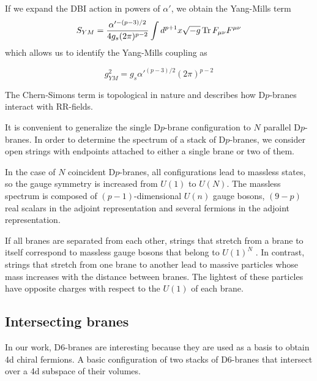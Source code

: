 If we expand the DBI action in powers of $\alpha'$, we obtain the Yang-Mills term
\begin{equation}
  S_{YM} = \frac{\alpha'^{-(p-3)/2}}{4g_s (2\pi)^{p-2}} \int d^{p+1} x \sqrt {-g} \Tr F_{\mu\nu} F^{\mu\nu}
\end{equation}
which allows us to identify the Yang-Mills coupling as 

\begin{equation}
g^2_{YM} = g_s \alpha'^{(p-3)/2}(2\pi)^{p-2}
\end{equation}

The Chern-Simons term is topological in nature and describes how D$p$-branes interact with RR-fields.


It is convenient to generalize the single D$p$-brane configuration to $N$ parallel D$p$-branes.
In order to determine the spectrum of a stack of D$p$-branes, we consider open strings with endpoints 
attached to either a single brane or two of them.

In the case of $N$ coincident D$p$-branes, all configurations lead to massless states, so the 
gauge symmetry is increased from $U(1)$ to $U(N)$.
The massless spectrum is composed of $(p-1)$-dimensional $U(n)$ gauge bosons, $(9-p)$ real
scalars in the adjoint representation and several fermions in the adjoint representation.

If all branes are separated from each other, strings that stretch from a brane to itself correspond to massless gauge bosons that belong to $U(1)^N$ .
In contrast, strings that stretch from one brane to another lead to massive particles whose
mass increases with the distance between branes.
The lightest of these particles have opposite charges with respect to the $U(1)$ of each brane.

\subsection{Intersecting branes}
In our work, D6-branes are interesting because they are used as a basis to obtain 4d chiral fermions.
A basic configuration of two stacks of D6-branes that intersect over a 4d subspace of their volumes.

